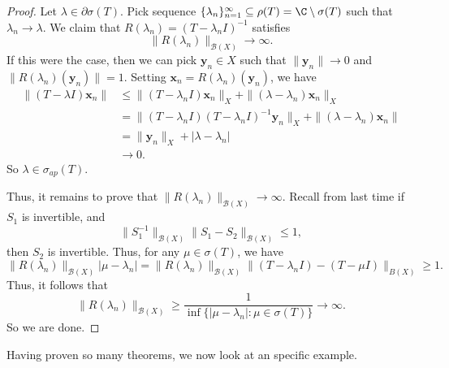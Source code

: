 \documentclass[a4paper]{article}
\begin{document}
\begin{proof}
  Let $\lambda \in \partial \sigma(T)$. Pick sequence $\{\lambda_n\}_{n = 1}^\infty \subseteq \rho(T) = \C\setminus \sigma(T)$ such that $\lambda_n \to \lambda$. We claim that $R(\lambda_n) = (T - \lambda_n I)^{-1}$ satisfies
  \[
    \|R(\lambda_n)\|_{\mathcal{B}(X)} \to \infty.
  \]
  If this were the case, then we can pick $\mathbf{y}_n \in X$ such that $\|\mathbf{y}_n\| \to 0$ and $\|R(\lambda_n)(\mathbf{y}_n)\| = 1$. Setting $\mathbf{x}_n = R(\lambda_n)(\mathbf{y}_n)$, we have
  \begin{align*}
    \|(T - \lambda I)\mathbf{x}_n \| &\leq \|(T - \lambda_n I) \mathbf{x}_n\|_X + \|(\lambda - \lambda_n) \mathbf{x}_n\|_X\\
    &= \|(T - \lambda_n I) (T - \lambda_n I)^{-1} \mathbf{y}_n\|_X + \|(\lambda - \lambda_n) \mathbf{x}_n\|\\
    &= \|\mathbf{y}_n\|_X + |\lambda - \lambda_n|\\
    &\to 0.
  \end{align*}
  So $\lambda \in \sigma_{ap}(T)$.

  Thus, it remains to prove that $\|R(\lambda_n)\|_{\mathcal{B}(X)} \to \infty$. Recall from last time if $S_1$ is invertible, and
  \[
    \|S_1^{-1}\|_{\mathcal{B}(X)} \|S_1 - S_2\|_{\mathcal{B}(X)} \leq 1, \tag{$*$}
  \]
  then $S_2$ is invertible. Thus, for any $\mu \in \sigma(T)$, we have
  \[
    \|R(\lambda_n)\|_{\mathcal{B}(X)} |\mu - \lambda_n| = \|R(\lambda_n)\|_{\mathcal{B}(X)} \|(T - \lambda_n I) - (T - \mu I)\|_{B(X)} \geq 1.
  \]
  Thus, it follows that
  \[
    \|R(\lambda_n)\|_{\mathcal{B}(X)} \geq \frac{1}{\inf\{ |\mu - \lambda_n|: \mu \in \sigma(T)\}} \to \infty.
  \]
  So we are done.
\end{proof}

Having proven so many theorems, we now look at an specific example.
\end{document}
